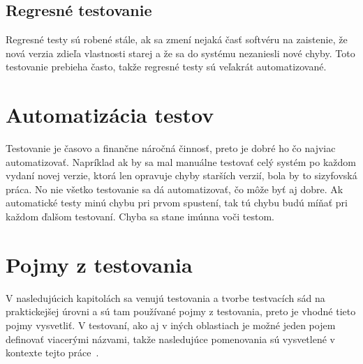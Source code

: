 \subsection*{Regresné testovanie}
\label{regression_tests}
Regresné testy sú robené stále, ak sa zmení nejaká časť softvéru na zaistenie, že nová verzia zdieľa vlastnosti starej a že sa do systému nezaniesli nové chyby.
Toto testovanie prebieha často, takže regresné testy sú veľakrát automatizované.

\section{Automatizácia testov}
\label{tests_automatization}
Testovanie je časovo a finančne náročná činnosť, preto je dobré ho čo najviac automatizovať.
Napríklad ak by sa mal manuálne testovať celý systém po každom vydaní novej verzie, ktorá len opravuje chyby starších verzií, bola by to sizyfovská práca.
No nie všetko testovanie sa dá automatizovať, čo môže byť aj dobre.
Ak automatické testy minú chybu pri prvom spustení, tak tú chybu budú míňať pri každom ďalšom testovaní.
Chyba sa stane imúnna voči testom.

\section{Pojmy z testovania}
\label{pojmy_testovanie}
V nasledujúcich kapitolách sa venujú testovania a tvorbe testvacích sád na praktickejšej úrovni a sú tam používané pojmy z testovania, preto je vhodné tieto pojmy vysvetliť.
V testovaní, ako aj v iných oblastiach je možné jeden pojem definovať viacerými názvami, takže nasledujúce pomenovania sú vysvetlené v kontexte tejto práce~\cite{Smrcka}.

